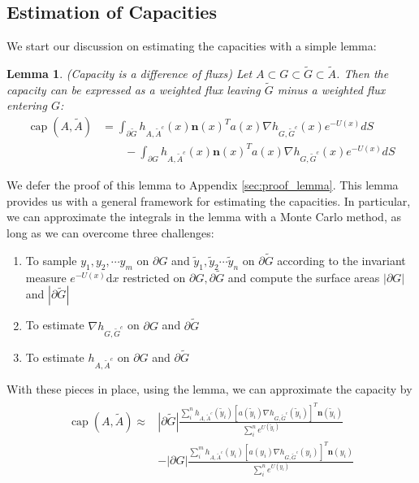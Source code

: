 \documentclass[english, aip, jcp, priprint, graphicx,floatfix]{revtex4-1}
\newtheorem{lemma}{Lemma}
\theoremstyle{plain}
\theoremstyle{definition}
\theoremstyle{plain}
\begin{document}
\subsection{Estimation of Capacities}

We start our discussion on estimating the capacities with a simple lemma:
\begin{lemma}(Capacity is a difference of fluxs) \label{lem:capacity_lemma} Let $A\subset G \subset \tilde G \subset \tilde A$.  Then the capacity can be expressed as a weighted flux leaving $\tilde G$ minus a weighted flux entering $G$:
\begin{align*}
\ensuremath{\operatorname{cap}} (A, \tilde{A}) &= \int_{\partial \tilde G}  h_{A, \tilde{A}^c} (x)   \textbf{n}(x)^T a (x) \nabla h_{G, \tilde{G}^c} (x)e^{- U (x)} dS \\
&\qquad - \int_{\partial G}  h_{A, \tilde{A}^c} (x)   \textbf{n}(x)^T a (x) \nabla h_{G, \tilde{G}^c} (x)e^{- U (x)} dS 
\end{align*}
\end{lemma}

We defer the proof of this lemma to Appendix \ref{sec:proof_lemma}. This lemma provides us with a general framework for estimating the capacities.   In particular, we can approximate the integrals in the lemma with a Monte Carlo method, as long as we can overcome three challenges:
\begin{enumerate}
    \item To sample $y_1,y_2,\cdots y_m$ on $\partial G$ and $\tilde y_1,\tilde y_2 \cdots \tilde y_n$ on $\partial \tilde{G}$ according to the invariant measure $e^{- U(x)}\mathrm{d}x$ restricted on $\partial G, \partial \tilde{G}$ and compute the surface areas $|\partial G|$ and $|\partial \tilde G|$

\item To estimate $\nabla h_{G, \tilde{G}^c}$ on $\partial G$ and
$\partial \tilde{G}$

\item To estimate $h_{A, \tilde{A}^c}$ on $\partial G$ and $\partial
\tilde{G}$
\end{enumerate}
With these pieces in place, using the lemma, we can approximate the capacity by
\begin{gather}\label{eq:capesteq}
\begin{array}{cc}
\ensuremath{\operatorname{cap}} (A, \tilde{A}) \approx & 
|\partial \tilde G|\frac{\sum_i^n h_{A,\tilde A^c}(\tilde y_i)[a(\tilde y_i)\nabla h_{G,\tilde G^c}(\tilde y_i)]^T \textbf{n}(\tilde y_i)}{\sum_i^n e^{U(\tilde y_i)}} \\
& - |\partial G|\frac{\sum_i^m h_{A,\tilde A^c}(y_i)[a(y_i)\nabla h_{G,\tilde G^c}(y_i)]^T \textbf{n}(y_i)}{\sum_i^n e^{U(y_i)}} 
\end{array}
\end{gather}
\end{document}

